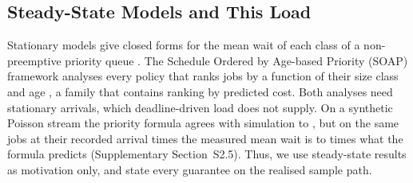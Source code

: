 \subsection{Steady-State Models and This Load}

Stationary models give closed forms for the mean wait of each class of a non-preemptive
priority queue \cite[pp.~499--507]{harcholbalter2013}. The Schedule Ordered by Age-based
Priority (SOAP) framework analyses every policy that ranks jobs by a function of their size
class and age \cite{scully2018soap}, a family that contains ranking by predicted cost. Both
analyses need stationary arrivals, which deadline-driven load does not supply. On a synthetic Poisson
stream the priority formula agrees with simulation to , but on the same jobs
at their recorded arrival times the measured mean wait is  to 
times what the formula predicts (Supplementary Section~S2.5). Thus, we use steady-state
results as motivation only, and state every guarantee on the realised sample path.

